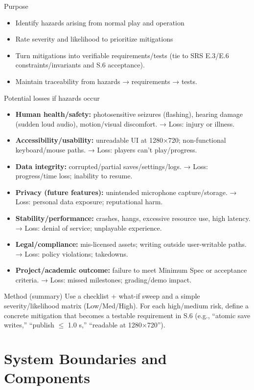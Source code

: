 \documentclass{article}
\begin{document}
Purpose
\begin{itemize}
\item{Identify hazards arising from normal play and operation}
\item{Rate severity and likelihood to prioritize mitigations}
\item{Turn mitigations into verifiable requirements/tests (tie to SRS E.3/E.6 constraints/invariants and S.6 acceptance).}
\item{Maintain traceability from hazards → requirements → tests.}
\end{itemize}

Potential losses if hazards occur
\begin{itemize}
\item{\textbf{Human health/safety:} photosensitive seizures (flashing), hearing damage (sudden loud audio), motion/visual discomfort. → Loss: injury or illness.}
\item{\textbf{Accessibility/usability:} unreadable UI at 1280×720; non-functional keyboard/mouse paths. → Loss: players can’t play/progress.}
\item{\textbf{Data integrity:} corrupted/partial saves/settings/logs. → Loss: progress/time loss; inability to resume.}
\item{\textbf{Privacy (future features):} unintended microphone capture/storage. → Loss: personal data exposure; reputational harm.}
\item{\textbf{Stability/performance:} crashes, hangs, excessive resource use, high latency. → Loss: denial of service; unplayable experience.}
\item{\textbf{Legal/compliance:} mis-licensed assets; writing outside user-writable paths. → Loss: policy violations; takedowns.}
\item{\textbf{Project/academic outcome:} failure to meet Minimum Spec or acceptance criteria. → Loss: missed milestones; grading/demo impact.}
\end{itemize}

Method (summary)
Use a checklist + what-if sweep and a simple severity/likelihood matrix (Low/Med/High). For each high/medium risk, define a concrete mitigation that becomes a testable requirement in S.6 (e.g., “atomic save writes,” “publish $\leq$ 1.0 s,” “readable at 1280×720”). 

\section{System Boundaries and Components}
\end{document}
